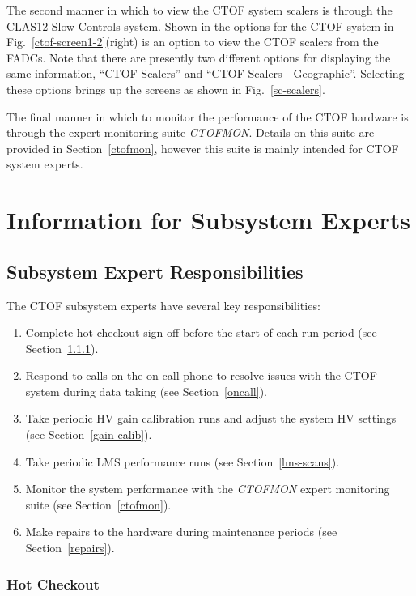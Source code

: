 \documentclass[12pt]{article}
\begin{document}
The second manner in which to view the CTOF system scalers is through the CLAS12 
Slow Controls system. Shown in the options for the CTOF system in 
Fig.~\ref{ctof-screen1-2}(right) is an option to view the CTOF scalers from the
FADCs. Note that there are presently two different options for displaying the
same information, ``CTOF Scalers'' and ``CTOF Scalers - Geographic''. Selecting 
these options brings up the screens as shown in Fig.~\ref{sc-scalers}.

The final manner in which to monitor the performance of the CTOF hardware is
through the expert monitoring suite {\it CTOFMON}. Details on this suite are
provided in Section~\ref{ctofmon}, however this suite is mainly intended for
CTOF system experts.

\clearpage

\vfil
\eject

\section{Information for Subsystem Experts}

\subsection{Subsystem Expert Responsibilities}

The CTOF subsystem experts have several key responsibilities:

\begin{enumerate}
\item Complete hot checkout sign-off before the start of each run period (see 
Section~\ref{checkout}).
\item Respond to calls on the on-call phone to resolve issues with the CTOF system 
during data taking (see Section~\ref{oncall}).
\item Take periodic HV gain calibration runs and adjust the system HV settings (see 
Section~\ref{gain-calib}).
\item Take periodic LMS performance runs (see Section~\ref{lms-scans}).
\item Monitor the system performance with the {\it CTOFMON} expert monitoring suite
(see Section~\ref{ctofmon}).
\item Make repairs to the hardware during maintenance periods (see 
Section~\ref{repairs}).
\end{enumerate}

\subsubsection{Hot Checkout}
\label{checkout}
\end{document}
